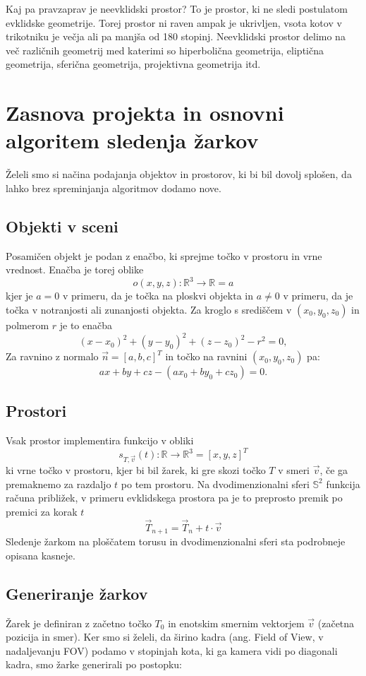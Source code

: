 \documentclass[titlepage]{article}
\begin{document}
Kaj pa pravzaprav je neevklidski prostor? To je prostor, ki ne sledi postulatom evklidske geometrije. 
Torej prostor ni raven ampak je ukrivljen, vsota kotov v trikotniku je večja ali pa manjša od 
180 stopinj. Neevklidski prostor delimo na več različnih geometrij med katerimi so 
hiperbolična geometrija, eliptična geometrija, sferična geometrija, projektivna geometrija itd.

\section{Zasnova projekta in osnovni algoritem sledenja žarkov}
Želeli smo si načina podajanja objektov in prostorov, ki bi bil dovolj splošen, da lahko brez
spreminjanja algoritmov dodamo nove.

\subsection{Objekti v sceni}
Posamičen objekt je podan z enačbo, ki sprejme točko v prostoru in vrne vrednost. 
Enačba je torej oblike
\[ o(x,y,z): \mathbb{R}^3 \to \mathbb{R} = a \]
kjer je \(a = 0\) v primeru, da je točka na ploskvi objekta in \( a \neq 0 \) v primeru, da 
je točka v notranjosti ali zunanjosti objekta.
Za kroglo s središčem v $(x_{0}, y_{0}, z_{0})$ in polmerom $r$ je to enačba
\[(x-x_{0})^{2}+(y-y_{0})^{2}+(z-z_{0})^{2}-r^{2}=0, \]
Za ravnino z normalo \( \vec{n} = [a, b, c]^T \) in točko na ravnini $(x_{0}, y_{0}, z_{0})$ pa:
\[ ax+by+cz-(ax_0+by_0+cz_0) = 0. \]

\subsection{Prostori}
Vsak prostor implementira funkcijo v obliki
\[ s_{T, \vec{v}}(t): \mathbb{R} \to \mathbb{R}^3 = [x, y, z]^T \]
ki vrne točko v prostoru, kjer bi bil žarek, ki gre skozi točko \(T\) v smeri \(\vec{v}\), če 
ga premaknemo za razdaljo \(t\) po tem prostoru. Na dvodimenzionalni sferi $\mathbb{S}^{2}$ funkcija računa približek, v primeru evklidskega prostora pa je to preprosto premik po premici za korak \(t\)
\[ \vec{T}_{n+1} = \vec{T}_{n} + t \cdot \vec{v} \]
\bigskip
\newline
Sledenje žarkom na ploščatem torusu in dvodimenzionalni sferi sta podrobneje opisana kasneje.

\subsection{Generiranje žarkov}
Žarek je definiran z začetno točko \(T_{0}\) in enotskim smernim vektorjem \(\vec{v}\) (začetna pozicija in smer). Ker smo si želeli, da 
širino kadra (ang. Field of View, v nadaljevanju FOV) podamo v stopinjah kota, ki ga kamera vidi po diagonali kadra,
smo žarke generirali po postopku:
\end{document}
